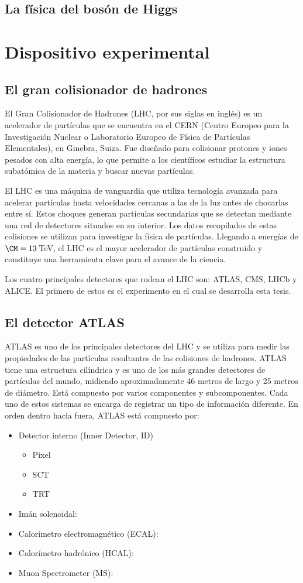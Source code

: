 \subsection{La física del bosón de Higgs}
\section{Dispositivo experimental}
\subsection{El gran colisionador de hadrones}
El Gran Colisionador de Hadrones (LHC, por sus siglas en inglés) es un acelerador de partículas que se encuentra
en el CERN (Centro Europeo para la Investigación Nuclear o Laboratorio Europeo de Física de Partículas 
Elementales), en Ginebra, Suiza. Fue diseñado para colisionar protones y iones pesados con alta energía, lo que
permite a los científicos estudiar la estructura subatómica de la materia y buscar nuevas partículas.

El LHC es una máquina de vanguardia que utiliza tecnología avanzada para acelerar partículas hasta velocidades 
cercanas a las de la luz antes de chocarlas entre sí. Estos choques generan partículas secundarias que se 
detectan mediante una red de detectores situados en su interior. Los datos recopilados de estas colisiones se 
utilizan para investigar la física de partículas.  Llegando a energías de $\CM = 13\,$TeV, el LHC es el mayor 
acelerador de partículas construido y constituye una herramienta clave para el avance de la ciencia.

Los cuatro principales detectores que rodean el LHC son: ATLAS, CMS, LHCb y ALICE. El primero
de estos es el experimento en el cual se desarrolla esta tesis.

\subsection{El detector ATLAS}
ATLAS es uno de los principales detectores del LHC y se utiliza para medir las propiedades de las partículas resultantes de las colisiones de hadrones. ATLAS tiene una estructura cilíndrica y es uno de los más grandes
detectores de partículas del mundo, midiendo aproximadamente 46 metros de largo y 25 metros de diámetro. 
Está compuesto por varios componentes y subcomponentes. Cada uno de estos sistemas se encarga de 
registrar un tipo de información diferente. En orden dentro hacia fuera, ATLAS está compuesto por:
\begin{itemize}
	\item Detector interno (Inner Detector, ID)
	\begin{itemize}
		\item Pixel
		\item SCT
		\item TRT	
	\end{itemize}
	\item Imán solenoidal:
	\item Calorímetro electromagnético (ECAL):
	\item Calorímetro hadrónico (HCAL):
	\item Muon Spectrometer (MS):
\end{itemize}

